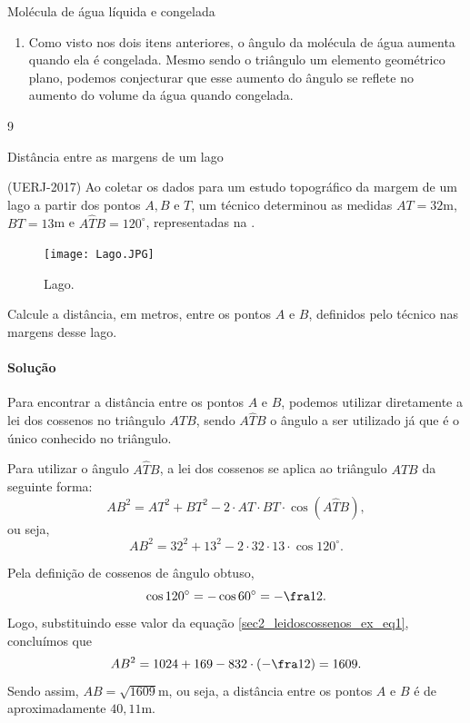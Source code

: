 \begin{answer}{Molécula de água líquida e congelada}
{\begin{enumerate}
    \item{}
    Como visto nos dois itens anteriores, o ângulo da molécula de água aumenta quando ela é congelada. Mesmo sendo o triângulo um elemento geométrico plano, podemos conjecturar que esse aumento do ângulo se reflete no aumento do volume da água quando congelada. 
\end{enumerate}
}{9}
\end{answer}
\def\currentcolor{session4}

\begin{example}{Distância entre as margens de um lago} \label{sec2_leidoscossenos_ex}

(UERJ-2017) Ao coletar os dados para um estudo topográfico da margem de um lago a partir dos pontos $A, B$ e $T$, um técnico determinou as medidas $AT = 32$m, $BT = 13$m e $A\hat{T}B = 120^\circ$, representadas na .
\begin{figure}[H]
    \centering
    \texttt{[image: Lago.JPG]}
    \caption{Lago.}
    \label{Lago}
\end{figure}
Calcule a distância, em metros, entre os pontos $A$ e $B$, definidos pelo técnico nas margens desse lago.

\paragraph{Solução}
\label{LA_sec2_leidoscossenos_exres}
Para encontrar a distância entre os pontos $A$ e $B$, podemos utilizar diretamente a lei dos cossenos no triângulo $ATB$, sendo $A\hat{T}B$ o ângulo a ser utilizado já que é o único conhecido no triângulo.

Para utilizar o ângulo $A\hat{T}B$, a lei dos cossenos se aplica ao triângulo $ATB$ da seguinte forma:
$$AB^2=AT^2+BT^2-2\cdot AT\cdot BT\cdot\cos(A\hat{T}B),$$ 
ou seja,
\begin{equation}
    AB^2=32^2+13^2-2\cdot32\cdot13\cdot\cos120^\circ. \label{sec2_leidoscossenos_ex_eq1}
\end{equation}

Pela definição de cossenos de ângulo obtuso,
$$\cos120^\circ=-\cos60^\circ=-\fra12.$$
Logo, substituindo esse valor da equação \eqref{sec2_leidoscossenos_ex_eq1}, concluímos que
$$AB^2=1024+169-832\cdot\left(-\fra12\right)=1609.$$
Sendo assim, $AB=\sqrt{1609}$m, ou seja, a distância entre os pontos $A$ e $B$ é de aproximadamente $40,11$m.
\end{example}

\label{prat_leidoscossenos}


